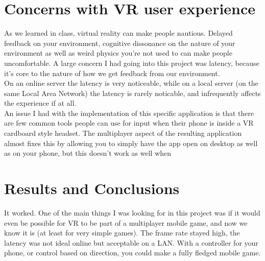 \documentclass{article}
\begin{document}
\clearpage


\section{Concerns with VR user experience}

	As we learned in class, virtual reality can make people nautious.  Delayed feedback on your environment, cognitive dissonance on the nature of your environment as well as weird physics you're not used to can make people uncomfortable.  A large concern I had going into this project was latency, because it's core to the nature of how we get feedback from our environment. \\
	
	On an online server the latency is very noticeable, while on a local server (on the same Local Area Network) the latency is rarely noticable, and infrequently affects the experience if at all.  \\
	
	An issue I had with the implementation of this specific application is that there are few common tools people can use for input when their phone is inside a VR cardboard style headset.  The multiplayer aspect of the resulting application almost fixes this by allowing you to simply have the app open on desktop as well as on your phone, but this doesn't work as well when 


\section{Results and Conclusions}

	It worked.  One of the main things I was looking for in this project was if it would even be possible for VR to be part of a multiplayer mobile game, and now we know it is (at least for very simple games).  The frame rate stayed high, the latency was not ideal online but acceptable on a LAN.  With a controller for your phone, or control based on direction, you could make a fully fledged mobile game. \\
	
\end{document}
